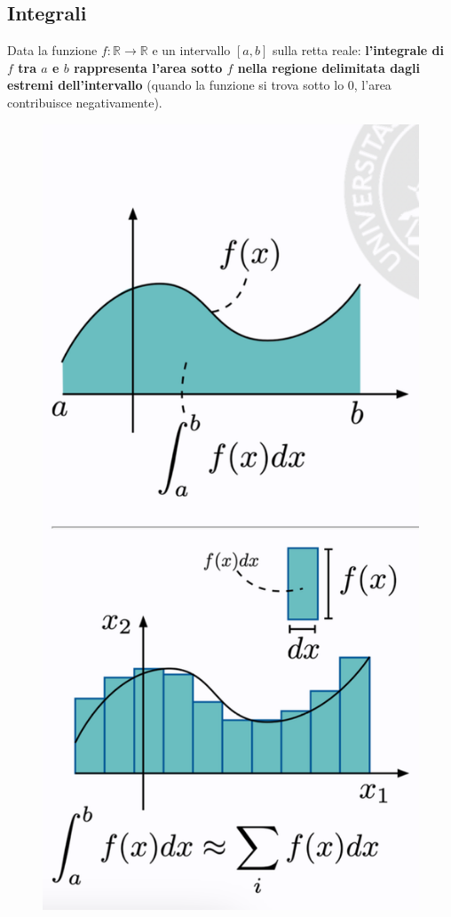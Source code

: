 \subsection{Integrali}
Data la funzione $f:\mathbb{R} \rightarrow \mathbb{R}$ e un intervallo $[a,b]$ sulla retta reale: \newline
\textbf{l'integrale di $f$ tra $a$ e $b$ rappresenta l'area sotto $f$ nella regione delimitata dagli estremi dell'intervallo} (quando la funzione si trova sotto lo 0, l'area contribuisce negativamente).
\begin{figure}[h]
    \includegraphics[scale=0.5]{images/prerequisites/integrals.png}
    \centering
\end{figure}
